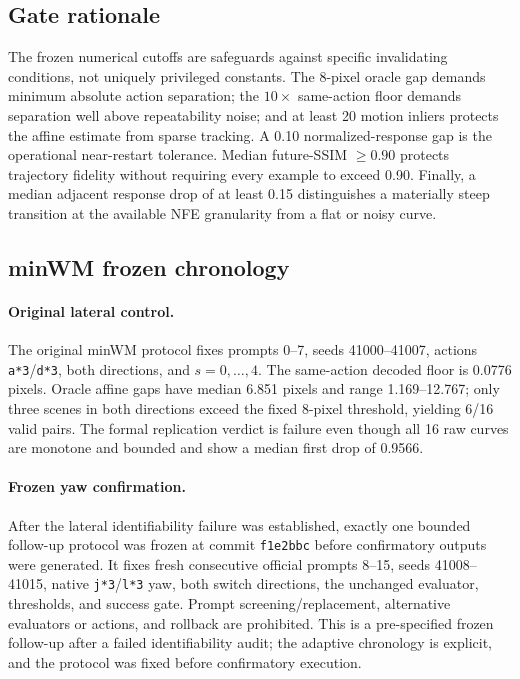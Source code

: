 \subsection{Gate rationale}

The frozen numerical cutoffs are safeguards against specific invalidating
conditions, not uniquely privileged constants. The 8-pixel oracle gap demands
minimum absolute action separation; the $10\times$ same-action floor demands
separation well above repeatability noise; and at least 20 motion inliers
protects the affine estimate from sparse tracking. A 0.10 normalized-response
gap is the operational near-restart tolerance. Median future-SSIM $\geq0.90$
protects trajectory fidelity without requiring every example to exceed 0.90.
Finally, a median adjacent response drop of at least 0.15 distinguishes a
materially steep transition at the available NFE granularity from a flat or
noisy curve.

\subsection{minWM frozen chronology}
\label{app:minwm}

\paragraph{Original lateral control.}
The original minWM protocol fixes prompts 0--7, seeds 41000--41007, actions
\texttt{a*3}/\texttt{d*3}, both directions, and $s=0,\ldots,4$. The
same-action decoded floor is 0.0776 pixels. Oracle affine gaps have median
6.851 pixels and range 1.169--12.767; only three scenes in both directions
exceed the fixed 8-pixel threshold, yielding 6/16 valid pairs. The
formal replication verdict is failure even though all 16 raw curves are
monotone and bounded and show a median first drop of 0.9566.

\paragraph{Frozen yaw confirmation.}
After the lateral identifiability failure was established, exactly one bounded
follow-up protocol was frozen at commit \texttt{f1e2bbc} before confirmatory
outputs were generated. It fixes fresh consecutive official prompts 8--15,
seeds 41008--41015, native \texttt{j*3}/\texttt{l*3} yaw, both switch
directions, the unchanged evaluator, thresholds, and success gate. Prompt
screening/replacement, alternative evaluators or actions, and rollback are
prohibited. This is a pre-specified frozen follow-up after a failed
identifiability audit; the adaptive chronology is explicit, and the protocol
was fixed before confirmatory execution.

